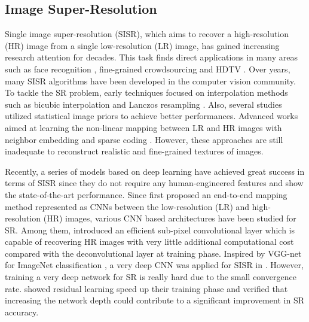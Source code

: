 \subsection{Image Super-Resolution}\label{sec:SISR}
Single image super-resolution (SISR), which aims to recover a high-resolution (HR) image from a single low-resolution (LR) image, has gained increasing research attention for decades. This task finds direct applications in many areas such as face recognition \cite{gunturk2003eigenface}, fine-grained crowdsourcing \cite{thornton2006sub} and HDTV \cite{park2003super}. Over years, many SISR algorithms have been developed in the computer vision community. To tackle the SR problem, early techniques focused on interpolation methods such as bicubic interpolation and Lanczos resampling \cite{duchon1979lanczos}. Also, several studies utilized statistical image priors \cite{sun2008image, tai2010super} to achieve better performances. Advanced works aimed at learning the non-linear mapping between LR and HR images with neighbor embedding \cite{chang2004super} and sparse coding \cite{yang2010image,timofte2014a}. However, these approaches are still inadequate to reconstruct realistic and fine-grained textures of images.

Recently, a series of models based on deep learning have achieved great success in terms of SISR since they do not require any human-engineered features and show the state-of-the-art performance. Since \citeauthor{dong2016srcnn} \cite{dong2016srcnn} first proposed an end-to-end mapping method represented as CNNs between the low-resolution (LR) and high-resolution (HR) images, various CNN based architectures have been studied for SR. Among them, \citeauthor{shi2016espcn} \cite{shi2016espcn} introduced an efficient sub-pixel convolutional layer which is capable of recovering HR images with very little additional computational cost compared with the deconvolutional layer at training phase. Inspired by VGG-net for ImageNet classification \cite{simonyan2014vgg}, a very deep CNN was applied for SISR in \cite{kim2016vdsr}. However, training a very deep network for SR is really hard due to the small convergence rate. \citeauthor{kim2016vdsr} \cite{kim2016vdsr} showed residual learning speed up their training phase and verified that increasing the network depth could contribute to a significant improvement in SR accuracy.


